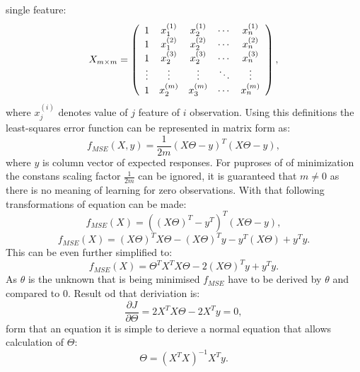 single feature:
\begin{equation}
	\label{equ:input_matrix}
	X_{m\times m}=\left( \begin{array}{c c c c c}
		1& x^{(1)}_{1}& x^{(1)}_{2}& \cdots& x^{(1)}_{n}\\
		1& x^{(2)}_{1}& x^{(2)}_{2}& \cdots& x^{(2)}_{n}\\
		1& x^{(3)}_{2}& x^{(3)}_{2}& \cdots& x^{(3)}_{n}\\
		\vdots&\vdots&\vdots&\ddots&\vdots\\
		1& x^{(m)}_{2}& x^{(m)}_{3}& \cdots& x^{(m)}_{n}\\
	\end{array}\right),
\end{equation}
where $x^{(i)}_{j}$ denotes value of $j$ feature of $i$ observation.
Using this definitions the least-squares error function can be represented in matrix form as:
\begin{equation}
	\label{equ:mse_matrix}
	f_{MSE}(X,y) = \frac{1}{2m}(X\Theta - y)^{T}(X\Theta - y), 
\end{equation}
where $y$ is column vector of expected responses.
For puproses of of minimization the constans scaling factor $\frac{1}{2m}$ can be ignored, it is
guaranteed that $m\neq 0$ as there is no meaning of learning for zero observations.
With that following transformations of equation can be made:
\begin{equation}
	\label{equ:mse_transform1}
	f_{MSE}(X) = ((X\Theta)^{T} - y^{T})^{T}(X\Theta - y), 
\end{equation}
\begin{equation}
	\label{equ:mse_transform2}
	f_{MSE}(X) = (X\Theta)^{T}X\Theta-(X\Theta)^{T}y-y^{T}(X\Theta)+y^{T}y.
\end{equation}
This can be even further simplified to:
\begin{equation}
	\label{equ:mse_transform2}
	f_{MSE}(X) = \Theta^{T}X^{T}X\Theta-2(X\Theta)^{T}y+y^{T}y. 
\end{equation}
As $\theta$ is the unknown that is being minimised $f_{MSE}$ have to be derived by $\theta$
and compared to 0.
Result od that deriviation is:
\begin{equation}
	\label{equ:mse_derived}
	\frac{\partial J}{\partial \Theta} = 2X^{T}X\Theta - 2X^{T}y = 0,
\end{equation}
form that an equation it is simple to derieve a normal equation that allows calculation of 
$\Theta$:
\begin{equation}
	\label{equ:mse_derived}
	\Theta = (X^{T}X)^{-1}X^{T}y.	
\end{equation}


